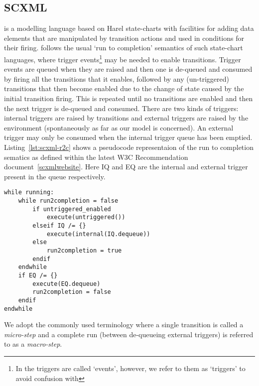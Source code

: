 

\subsection{SCXML}
\label{sec:scxml}

\SCXML is a modelling language based on Harel state-charts with facilities for adding data elements that are manipulated by transition actions and used in conditions for their firing. \SCXML follows the usual `run to completion' semantics of such state-chart languages, where trigger events\footnote{In \SCXML the triggers are called `events', however, we refer to them as `triggers' to avoid confusion with \EventB} may be needed to enable transitions. Trigger events are queued when they are raised and then one is de-queued and consumed by firing all the transitions that it enables, followed by any (un-triggered) transitions that then become enabled due to the change of state caused by the initial transition firing. This is repeated until no transitions are enabled and then the next trigger is de-queued and consumed. There are two kinds of triggers: internal triggers are raised by transitions and external triggers are raised by the environment (spontaneously as far as our model is concerned). An external trigger may only be consumed when the internal trigger queue has been emptied. Listing~\ref{lst:scxml-r2c} shows a pseudocode representaion of the run to completion sematics as defined within the latest W3C Recommendation document~\ref{scxmlwebsite}. Here IQ and EQ are the internal and external trigger present in the queue respectively. 

\begin{lstlisting}[caption=Pseudocode for 'run to completion',label={lst:scxml-r2c}]
while running:
	while run2completion = false
		if untriggered_enabled
			execute(untriggered())
		elseif IQ /= {}
			execute(internal(IQ.dequeue)) 
		else
			run2completion = true
		endif
	endwhile
	if EQ /= {}
		execute(EQ.dequeue) 
		run2completion = false
	endif
endwhile 
\end{lstlisting}

We adopt the commonly used terminology where a single transition is called a \emph{micro-step} and a complete run (between de-queueing external triggers) is referred to as a \emph{macro-step}.
